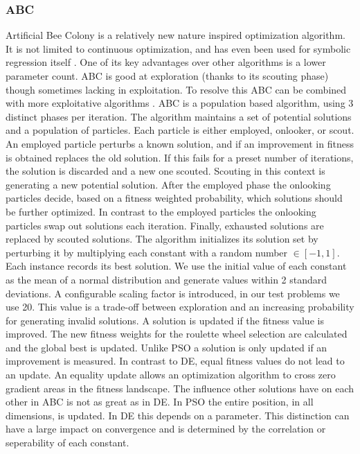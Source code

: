 \subsubsection{ABC}
Artificial Bee Colony \citep{ABC} is a relatively new nature inspired optimization algorithm. It is not limited to continuous optimization, and has even been used for symbolic regression itself \cite{ABCSR}. One of its key advantages over other algorithms is a lower parameter count. ABC is good at exploration (thanks to its scouting phase) though sometimes lacking in exploitation. To resolve this ABC can be combined with more exploitative algorithms \citep{ABCPSO}.
ABC is a population based algorithm, using 3 distinct phases per iteration. The algorithm maintains a set of potential solutions and a population of particles. Each particle is either employed, onlooker, or scout. An employed particle perturbs a known solution, and if an improvement in fitness is obtained replaces the old solution. If this fails for a preset number of iterations, the solution is discarded and a new one scouted. Scouting in this context is generating a new potential solution. After the employed phase the onlooking particles decide, based on a fitness weighted probability, which solutions should be further optimized. In contrast to the employed particles the onlooking particles swap out solutions each iteration. Finally, exhausted solutions are replaced by scouted solutions.
The algorithm initializes its solution set by perturbing it by multiplying each constant with a random number $\in [-1,1]$. Each instance records its best solution. We use the initial value of each constant as the mean of a normal distribution and generate values within 2 standard deviations. A configurable scaling factor is introduced, in our test problems we use 20. This value is a trade-off between exploration and an increasing probability for generating invalid solutions.  A solution is updated if the fitness value is improved. The new fitness weights for the roulette wheel selection are calculated and the global best is updated. Unlike PSO a solution is only updated if an improvement is measured. In contrast to DE, equal fitness values do not lead to an update. An equality update allows an optimization algorithm to cross zero gradient areas in the fitness landscape. The influence other solutions have on each other in ABC is not as great as in DE. In PSO the entire position, in all dimensions, is updated. In DE this depends on a parameter. This distinction can have a large impact on convergence and is determined by the correlation or seperability of each constant.
